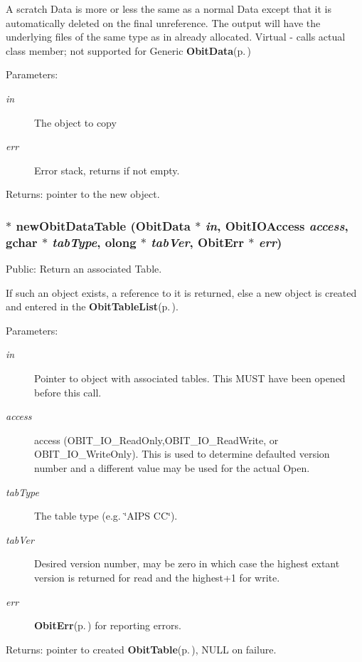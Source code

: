A scratch Data is more or less the same as a normal Data except that it is automatically deleted on the final unreference. The output will have the underlying files of the same type as in already allocated. Virtual - calls actual class member; not supported for Generic {\bf Obit\-Data}{\rm (p.\,\pageref{structObitData})} \begin{Desc}
\item[Parameters:]
\begin{description}
\item[{\em in}]The object to copy \item[{\em err}]Error stack, returns if not empty. \end{description}
\end{Desc}
\begin{Desc}
\item[Returns:]pointer to the new object. \end{Desc}
\subsubsection{$\ast$ new\-Obit\-Data\-Table ({\bf Obit\-Data} $\ast$ {\em in}, Obit\-IOAccess {\em access}, gchar $\ast$ {\em tab\-Type}, {\bf olong} $\ast$ {\em tab\-Ver}, {\bf Obit\-Err} $\ast$ {\em err})}\label{ObitData_8c_a19}


Public: Return an associated Table. 

If such an object exists, a reference to it is returned, else a new object is created and entered in the {\bf Obit\-Table\-List}{\rm (p.\,\pageref{structObitTableList})}. \begin{Desc}
\item[Parameters:]
\begin{description}
\item[{\em in}]Pointer to object with associated tables. This MUST have been opened before this call. \item[{\em access}]access (OBIT\_\-IO\_\-Read\-Only,OBIT\_\-IO\_\-Read\-Write, or OBIT\_\-IO\_\-Write\-Only). This is used to determine defaulted version number and a different value may be used for the actual Open. \item[{\em tab\-Type}]The table type (e.g. \char`\"{}AIPS CC\char`\"{}). \item[{\em tab\-Ver}]Desired version number, may be zero in which case the highest extant version is returned for read and the highest+1 for write. \item[{\em err}]{\bf Obit\-Err}{\rm (p.\,\pageref{structObitErr})} for reporting errors. \end{description}
\end{Desc}
\begin{Desc}
\item[Returns:]pointer to created {\bf Obit\-Table}{\rm (p.\,\pageref{structObitTable})}, NULL on failure. \end{Desc}
